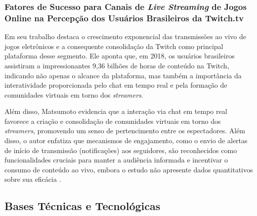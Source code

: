 \subsubsection{Fatores de Sucesso para Canais de \textit{Live Streaming} de Jogos Online na Percepção dos Usuários Brasileiros da Twitch.tv}

Em seu trabalho \cite{matsumoto2019} destaca o crescimento exponencial das transmissões ao vivo de jogos eletrônicos e a consequente consolidação da Twitch como principal plataforma desse segmento. Ele aponta que, em 2018, os usuários brasileiros assistiram a impressionantes 9,36 bilhões de horas de conteúdo na Twitch, indicando não apenas o alcance da plataforma, mas também a importância da interatividade proporcionada pelo chat em tempo real e pela formação de comunidades virtuais em torno dos \textit{streamers}.

Além disso, Matsumoto evidencia que a interação via chat em tempo real favorece a criação e consolidação de comunidades virtuais em torno dos \textit{streamers}, promovendo um senso de pertencimento entre os espectadores. Além disso, o autor enfatiza que mecanismos de engajamento, como o envio de alertas de início de transmissão (notificações) aos seguidores, são reconhecidos como funcionalidades cruciais para manter a audiência informada e incentivar o consumo de conteúdo ao vivo, embora o estudo não apresente dados quantitativos sobre sua eficácia \cite{matsumoto2019}.
\

\subsection{Bases Técnicas e Tecnológicas}

